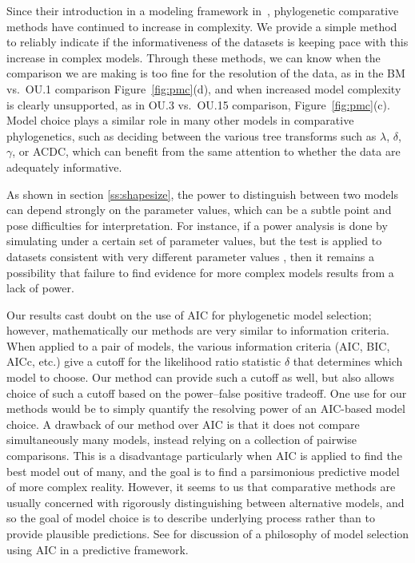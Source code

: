 Since their introduction in a modeling framework in~\citet{Felsenstein1985}, 
phylogenetic comparative methods have continued to increase in complexity.  
We provide a simple method to reliably indicate if the informativeness of the datasets is keeping pace with this increase in complex models.  
Through these methods, 
we can know when the comparison we are making is too fine for the resolution of the data,
as in the BM vs.\ OU.1 comparison Figure~\ref{fig:pmc}(d), and when increased model complexity is clearly unsupported,
as in OU.3 vs.\ OU.15 comparison, Figure~\ref{fig:pmc}(c). 
Model choice plays a similar role in many other models in comparative phylogenetics, 
such as deciding between the various tree transforms such as $\lambda$, $\delta$, $\gamma$, or ACDC,
which can benefit from the same attention to whether the data are adequately informative. 

As shown in section \ref{ss:shapesize}, the power to distinguish between two models
can depend strongly on the parameter values,
which can be a subtle point and pose difficulties for interpretation.
For instance, 
if a power analysis is done by simulating under a certain set of parameter values,
but the test is applied to datasets consistent with very different parameter values
\citep[a situation found in][]{Harmon2010},
then it remains a possibility that failure to find evidence for more complex models
results from a lack of power.

Our results cast doubt on the use of AIC for phylogenetic model selection;
however, mathematically our methods are very similar to information criteria.
When applied to a pair of models, the various information criteria (AIC, BIC, AICc, etc.)
give a cutoff for the likelihood ratio statistic $\delta$
that determines which model to choose.
Our method can provide such a cutoff as well,
but also allows choice of such a cutoff based on the power--false positive tradeoff.
One use for our methods would be to simply
quantify the resolving power of an AIC-based model choice.
A drawback of our method over AIC is that it does not compare simultaneously many models,
instead relying on a collection of pairwise comparisons.
This is a disadvantage particularly when AIC is applied to find the best model out of many,
and the goal is to find a parsimonious predictive model of more complex reality.
However, it seems to us that comparative methods are usually concerned with 
rigorously distinguishing between alternative models, and so
the goal of model choice is to describe underlying process 
rather than to provide plausible predictions.
See \citet{Burnham2002} for discussion of a philosophy of model selection using AIC in a predictive framework.  


